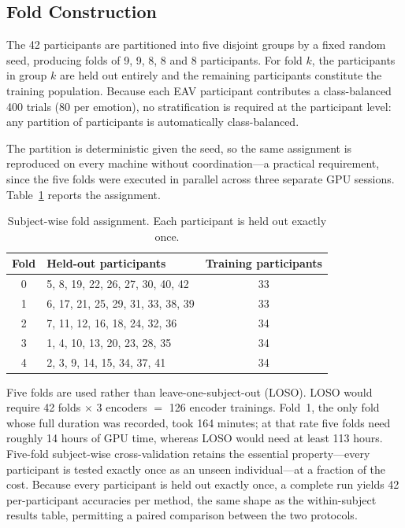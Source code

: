 \subsection{Fold Construction}

The 42 participants are partitioned into five disjoint groups by a fixed random seed,
producing folds of 9, 9, 8, 8 and 8 participants. For fold $k$, the participants in
group $k$ are held out entirely and the remaining participants constitute the
training population. Because each EAV participant contributes a class-balanced 400
trials (80 per emotion), no stratification is required at the participant level: any
partition of participants is automatically class-balanced.

The partition is deterministic given the seed, so the same assignment is reproduced on
every machine without coordination---a practical requirement, since the five folds
were executed in parallel across three separate GPU sessions. Table~\ref{tab:cs_folds}
reports the assignment.

\begin{table}[htbp]
\centering
\caption{Subject-wise fold assignment. Each participant is held out exactly once.}
\label{tab:cs_folds}
\begin{tabular}{clc}
\hline
\textbf{Fold} & \textbf{Held-out participants} & \textbf{Training participants} \\
\hline
0 & 5, 8, 19, 22, 26, 27, 30, 40, 42 & 33 \\
1 & 6, 17, 21, 25, 29, 31, 33, 38, 39 & 33 \\
2 & 7, 11, 12, 16, 18, 24, 32, 36 & 34 \\
3 & 1, 4, 10, 13, 20, 23, 28, 35 & 34 \\
4 & 2, 3, 9, 14, 15, 34, 37, 41 & 34 \\
\hline
\end{tabular}
\end{table}

Five folds are used rather than leave-one-subject-out (LOSO). LOSO would require 42
folds $\times$ 3 encoders $=$ 126 encoder trainings. Fold~1, the only fold whose full
duration was recorded, took 164 minutes; at that rate five folds need roughly 14 hours of
GPU time, whereas LOSO would need at least 113 hours. Five-fold subject-wise
cross-validation retains the essential property---every participant is tested exactly
once as an unseen individual---at a fraction of the cost. Because every participant is
held out exactly once, a complete run yields 42 per-participant accuracies per method,
the same shape as the within-subject results table, permitting a paired comparison
between the two protocols.

